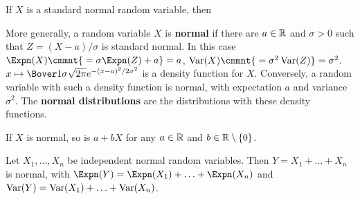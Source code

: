  If $X$ is a standard normal random variable,
then




 More generally, a random variable $X$ is {\bf
normal} if there are $a\in\Bbb R$ and $\sigma>0$ such that
$Z=(X-a)/\sigma$ is standard normal.   In this
case
$\Expn(X)\cmmnt{\mskip5mu =\sigma\Expn(Z)+a}=a$,
$\Var(X)\cmmnt{\mskip5mu =\sigma^2\Var(Z)}=\sigma^2$.
$x\mapsto\Bover1{\sigma\sqrt{2\pi}}e^{-(x-a)^2/2\sigma^2}$
is a density function for $X$.
Conversely, a random variable
with such a density function is normal,
with expectation $a$ and variance $\sigma^2$.
The {\bf normal distributions} are the distributions with these density
functions.

 If $X$ is normal, so is $a+bX$ for any $a\in\Bbb R$ and
$b\in\Bbb R\setminus\{0\}$.

 Let $X_1,\ldots,X_n$ be independent normal
random variables.   Then $Y=X_1+\ldots+X_n$ is normal, with
$\Expn(Y)=\Expn(X_1)+\ldots+\Expn(X_n)$ and
$\mathop{\text{Var}}(Y)=\mathop{\text{Var}}(X_1)+\ldots+\mathop{\text{Var}}(X_n)$.

